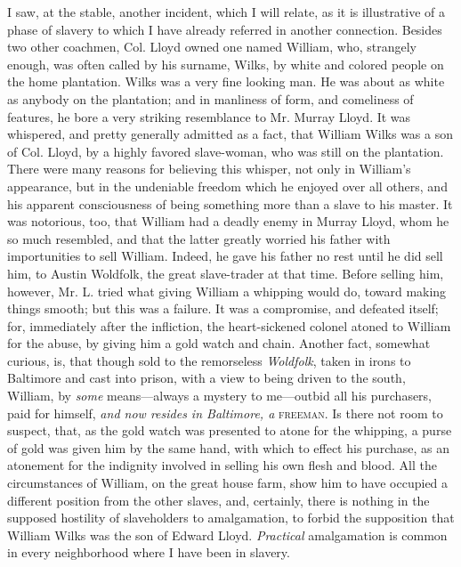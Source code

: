 I saw, at the stable, another incident, which I will relate, as it is
illustrative of a phase of slavery to which I have already referred in
another connection. {\protect\hypertarget{115}{}{}}Besides two other
coachmen, Col. Lloyd owned one named William, who, strangely enough, was
often called by his surname, Wilks, by white and colored people on the
home plantation. Wilks was a very fine looking man. He was about as
white as anybody on the plantation; and in manliness of form, and
comeliness of features, he bore a very striking resemblance to Mr.
Murray Lloyd. It was whispered, and pretty generally admitted as a fact,
that William Wilks was a son of Col. Lloyd, by a highly favored
slave-woman, who was still on the plantation. There were many reasons
for believing this whisper, not only in William's appearance, but in the
undeniable freedom which he enjoyed over all others, and his apparent
consciousness of being something more than a slave to his master. It was
notorious, too, that William had a deadly enemy in Murray Lloyd, whom he
so much resembled, and that the latter greatly worried his father with
importunities to sell William. Indeed, he gave his father no rest until
he did sell him, to Austin Woldfolk, the great slave-trader at that
time. Before selling him, however, Mr. L. tried what giving William a
whipping would do, toward making things smooth; but this was a failure.
It was a compromise, and defeated itself; for, immediately after the
infliction, the heart-sickened colonel atoned to William for the abuse,
by giving him a gold watch and chain. Another fact, somewhat curious,
is, that though sold to the remorseless \emph{Woldfolk}, taken in irons
to Baltimore and cast into prison, with a view to being driven to the
south, William, by \emph{some} means---always a mystery to me---outbid
all his {\protect\hypertarget{116}{}{}}purchasers, paid for himself,
\emph{and now resides in Baltimore, a} \textsc{freeman}. Is there not
room to suspect, that, as the gold watch was presented to atone for the
whipping, a purse of gold was given him by the same hand, with which to
effect his purchase, as an atonement for the indignity involved in
selling his own flesh and blood. All the circumstances of William, on
the great house farm, show him to have occupied a different position
from the other slaves, and, certainly, there is nothing in the supposed
hostility of slaveholders to amalgamation, to forbid the supposition
that William Wilks was the son of Edward Lloyd. \emph{Practical}
amalgamation is common in every neighborhood where I have been in
slavery.

